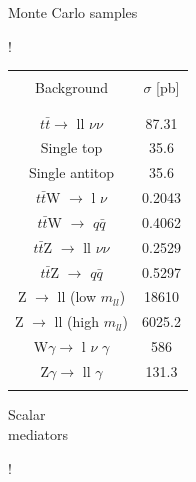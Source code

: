 \documentclass[8 pt]{beamer}
\begin{document}
\begin{frame}{Monte Carlo samples}
\hspace{4pt}
\begin{minipage}[c]{.02\linewidth}
	\begin{exampleblock}{}  \end{exampleblock}
\end{minipage}	
\hspace{8pt}
\begin{minipage}[c]{.28\linewidth}
\begin{table}
\centering
\resizebox{95pt} {!}{
\begin{tabular}{c|c}
& \\
Background & $\sigma$ [pb] \\
& \\
 \hline \hline
 & \\
$t \bar t \rightarrow$ ll $\nu$$\nu$ & 87.31 \\
Single top & 35.6  \\
Single antitop & 35.6 \\
$t \bar t$W $\rightarrow$ l $\nu$ & 0.2043  \\
$t \bar t$W $\rightarrow$ $q \bar q$ & 0.4062 \\
$t \bar t$Z $\rightarrow$ ll $\nu$$\nu$ & 0.2529 \\
$t \bar t$Z $\rightarrow$ $q \bar q$ & 0.5297  \\
Z $\rightarrow$ ll (low $m_{ll}$) & 18610  \\
Z $\rightarrow$ ll (high $m_{ll}$) & 6025.2  \\
W$\gamma \rightarrow$ l $\nu$ $\gamma$ & 586 \\
Z$\gamma \rightarrow$ ll $\gamma$ & 131.3 \\
& \\
\end{tabular}
}
\end{table} 
   	\end{minipage} \hfill
   	\begin{minipage}[c]{.22\linewidth}
	\begin{center}
	\begin{exampleblock}{} \begin{center} Scalar \\ mediators \end{center} \end{exampleblock}
	\end{center}
	\vspace{-8pt}
\begin{table}
\centering
\resizebox{74pt} {!}{
}
\end{table}
\end{minipage}
\end{frame}
\end{document}
